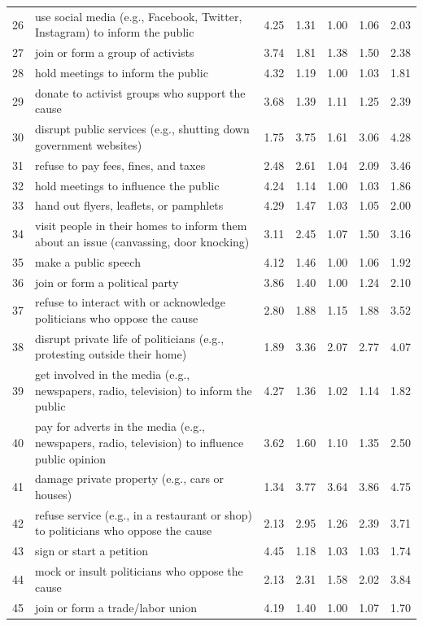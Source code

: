 \documentclass[12pt, letterpaper]{article}
\begin{document}
\begin{xltabular}{\linewidth}{rXrrrrr}
26 & use social media (e.g., Facebook, Twitter, Instagram) to inform the public & 4.25 & 1.31 & 1.00 & 1.06 & 2.03\\
27 & join or form a group of activists & 3.74 & 1.81 & 1.38 & 1.50 & 2.38\\
28 & hold meetings to inform the public & 4.32 & 1.19 & 1.00 & 1.03 & 1.81\\
29 & donate to activist groups who support the cause & 3.68 & 1.39 & 1.11 & 1.25 & 2.39\\
30 & disrupt public services (e.g., shutting down government websites) & 1.75 & 3.75 & 1.61 & 3.06 & 4.28\\

31 & refuse to pay fees, fines, and taxes & 2.48 & 2.61 & 1.04 & 2.09 & 3.46\\
32 & hold meetings to influence the public & 4.24 & 1.14 & 1.00 & 1.03 & 1.86\\
33 & hand out flyers, leaflets, or pamphlets & 4.29 & 1.47 & 1.03 & 1.05 & 2.00\\
34 & visit people in their homes to inform them about an issue (canvassing, door knocking) & 3.11 & 2.45 & 1.07 & 1.50 & 3.16\\
35 & make a public speech & 4.12 & 1.46 & 1.00 & 1.06 & 1.92\\

36 & join or form a political party & 3.86 & 1.40 & 1.00 & 1.24 & 2.10\\
37 & refuse to interact with or acknowledge politicians who oppose the cause & 2.80 & 1.88 & 1.15 & 1.88 & 3.52\\
38 & disrupt private life of politicians (e.g., protesting outside their home) & 1.89 & 3.36 & 2.07 & 2.77 & 4.07\\
39 & get involved in the media (e.g., newspapers, radio, television) to inform the public & 4.27 & 1.36 & 1.02 & 1.14 & 1.82\\
40 & pay for adverts in the media (e.g., newspapers, radio, television) to influence public opinion & 3.62 & 1.60 & 1.10 & 1.35 & 2.50\\

41 & damage private property (e.g., cars or houses) & 1.34 & 3.77 & 3.64 & 3.86 & 4.75\\
42 & refuse service (e.g., in a restaurant or shop) to politicians who oppose the cause & 2.13 & 2.95 & 1.26 & 2.39 & 3.71\\
43 & sign or start a petition & 4.45 & 1.18 & 1.03 & 1.03 & 1.74\\
44 & mock or insult politicians who oppose the cause & 2.13 & 2.31 & 1.58 & 2.02 & 3.84\\
45 & join or form a trade/labor union & 4.19 & 1.40 & 1.00 & 1.07 & 1.70\\


\end{xltabular}
\end{document}
